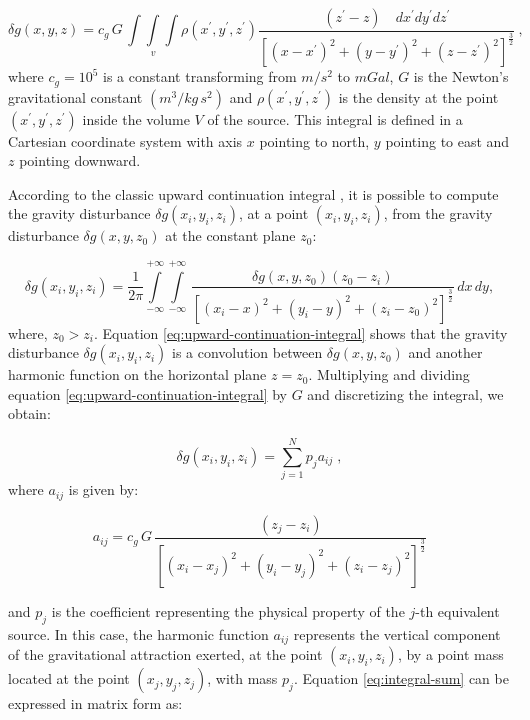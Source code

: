 \documentclass[paper]{geophysics}
\begin{document}
\begin{equation}
\delta g(x, y, z) = c_{g} \, G \, \int\int\limits_{v}\int \rho(x^{\prime}, y^{\prime}, z^{\prime}) \frac{(z^{\prime} - z) \quad dx^{\prime}dy^{\prime}dz^{\prime}}{[(x - x^{\prime})^{2} + (y - y^{\prime})^{2} + (z - z^{\prime})^{2}]^{\frac{3}{2}}}\: ,
\label{eq:gravity-disturbance}
\end{equation}
where $c_{g} = 10^5$ is a constant transforming from $m/s^2$ to $mGal$, $G$ is the Newton's gravitational constant $(m^3/kg \, s^2)$ and $\rho(x^{\prime}, y^{\prime}, z^{\prime})$ is the density at the point $(x^{\prime}, y^{\prime}, z^{\prime})$ inside the volume $V$ of the source. This integral is defined in a Cartesian coordinate system with axis $x$ pointing to north, $y$ pointing to east and $z$ pointing downward.

According to the classic upward continuation integral \citep{henderson1960comprehensive, henderson1970validity}, it is possible to compute the gravity disturbance $\delta g(x_{i}, y_{i}, z_{i})$, at a point $(x_i, y_i, z_i)$, from the gravity disturbance $\delta g(x, y, z_{0})$ at the constant plane $z_{0}$:

\begin{equation}
\delta g(x_i, y_i, z_i) = \frac{1}{2\pi}  \int\limits_{-\infty}^{+\infty} \int\limits_{-\infty}^{+\infty} \,
\frac{\delta g(x, y, z_0) (z_{0} - z_{i})}{\left[(x_{i} - x)^{2} +
	(y_{i} - y)^{2} +
	(z_{i} - z_{0})^{2} \right]^{\frac{3}{2}}} \, 
dx \, dy,
\label{eq:upward-continuation-integral}
\end{equation}
where, $z_0 > z_i$.
Equation \ref{eq:upward-continuation-integral} shows that the gravity disturbance $\delta g(x_{i}, y_{i}, z_{i})$ is a convolution between $\delta g(x, y, z_{0})$ and another harmonic function on the horizontal plane $z=z_0$.
Multiplying and dividing equation \ref{eq:upward-continuation-integral} by $G$ and discretizing the integral, we obtain:

\begin{equation}
\delta g(x_{i}, y_{i}, z_{i}) = \sum_{j=1}^{N} p_j a_{ij} \; ,
\label{eq:integral-sum}
\end{equation}
where $a_{ij}$ is given by:

\begin{equation}
a_{ij}= c_{g} \, G \, \frac{(z_{j} - z_{i})}{\left[(x_{i} - x_{j})^{2} +	(y_{i} - y_{j})^{2} +	(z_{i} - z_{j})^{2} \right]^{\frac{3}{2}}}
\label{eq:aij}
\end{equation}

\noindent and $p_j$ is the coefficient representing the physical property of the $j$-th equivalent source. In this case, the harmonic function $a_{ij}$ represents the vertical component of the gravitational attraction exerted, at the point $(x_{i}, y_{i}, z_{i})$, by a point mass located at the point $(x_{j}, y_{j}, z_{j})$, with mass $p_{j}$.
Equation \ref{eq:integral-sum} can be expressed in matrix form as:
\end{document}
